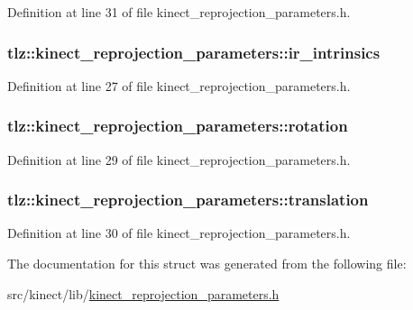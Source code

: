 Definition at line 31 of file kinect\+\_\+reprojection\+\_\+parameters.\+h.

\subsubsection[{\texorpdfstring{ir\+\_\+intrinsics}{ir_intrinsics}}]{ tlz\+::kinect\+\_\+reprojection\+\_\+parameters\+::ir\+\_\+intrinsics}\hypertarget{structtlz_1_1kinect__reprojection__parameters_a6b3acf29e3ad48ce93abefd55f27a094}{}\label{structtlz_1_1kinect__reprojection__parameters_a6b3acf29e3ad48ce93abefd55f27a094}


Definition at line 27 of file kinect\+\_\+reprojection\+\_\+parameters.\+h.

\subsubsection[{\texorpdfstring{rotation}{rotation}}]{ tlz\+::kinect\+\_\+reprojection\+\_\+parameters\+::rotation}\hypertarget{structtlz_1_1kinect__reprojection__parameters_ac7fdf95ebee703b30fc12bed872d4359}{}\label{structtlz_1_1kinect__reprojection__parameters_ac7fdf95ebee703b30fc12bed872d4359}


Definition at line 29 of file kinect\+\_\+reprojection\+\_\+parameters.\+h.

\subsubsection[{\texorpdfstring{translation}{translation}}]{ tlz\+::kinect\+\_\+reprojection\+\_\+parameters\+::translation}\hypertarget{structtlz_1_1kinect__reprojection__parameters_a047b6fa80fb7abd56ea6f67b8a3646b0}{}\label{structtlz_1_1kinect__reprojection__parameters_a047b6fa80fb7abd56ea6f67b8a3646b0}


Definition at line 30 of file kinect\+\_\+reprojection\+\_\+parameters.\+h.



The documentation for this struct was generated from the following file\+:\begin{DoxyCompactItemize}
\item 
src/kinect/lib/\hyperlink{kinect__reprojection__parameters_8h}{kinect\+\_\+reprojection\+\_\+parameters.\+h}\end{DoxyCompactItemize}
